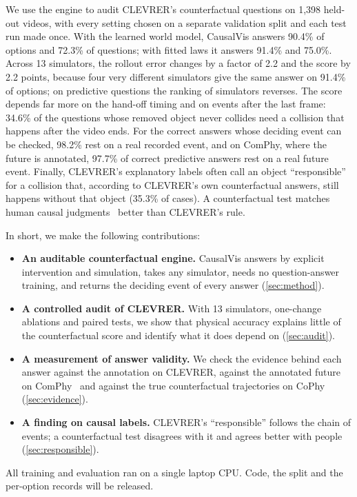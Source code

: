 \documentclass[10pt,twocolumn,letterpaper]{article}
\newcommand{\sys}{CausalVis}
\begin{document}
We use the engine to audit CLEVRER's counterfactual questions on 1,398 held-out videos, with every setting chosen on a separate validation split and each test run made once.
With the learned world model, \sys{} answers 90.4\% of options and 72.3\% of questions; with fitted laws it answers 91.4\% and 75.0\%.
Across 13 simulators, the rollout error changes by a factor of 2.2 and the score by 2.2 points, because four very different simulators give the same answer on 91.4\% of options; on predictive questions the ranking of simulators reverses.
The score depends far more on the hand-off timing and on events after the last frame: 34.6\% of the questions whose removed object never collides need a collision that happens after the video ends.
For the correct answers whose deciding event can be checked, 98.2\% rest on a real recorded event, and on ComPhy, where the future is annotated, 97.7\% of correct predictive answers rest on a real future event.
Finally, CLEVRER's explanatory labels often call an object ``responsible'' for a collision that, according to CLEVRER's own counterfactual answers, still happens without that object (35.3\% of cases).
A counterfactual test matches human causal judgments~\cite{mao2022clevrerhumans} better than CLEVRER's rule.

In short, we make the following contributions:
\begin{itemize}
\item \textbf{An auditable counterfactual engine.} \sys{} answers by explicit intervention and simulation, takes any simulator, needs no question-answer training, and returns the deciding event of every answer (\cref{sec:method}).
\item \textbf{A controlled audit of CLEVRER.} With 13 simulators, one-change ablations and paired tests, we show that physical accuracy explains little of the counterfactual score and identify what it does depend on (\cref{sec:audit}).
\item \textbf{A measurement of answer validity.} We check the evidence behind each answer against the annotation on CLEVRER, against the annotated future on ComPhy~\cite{chen2022comphy} and against the true counterfactual trajectories on CoPhy~\cite{baradel2020cophy} (\cref{sec:evidence}).
\item \textbf{A finding on causal labels.} CLEVRER's ``responsible'' follows the chain of events; a counterfactual test disagrees with it and agrees better with people (\cref{sec:responsible}).
\end{itemize}
All training and evaluation ran on a single laptop CPU. Code, the split and the per-option records will be released.
\end{document}
